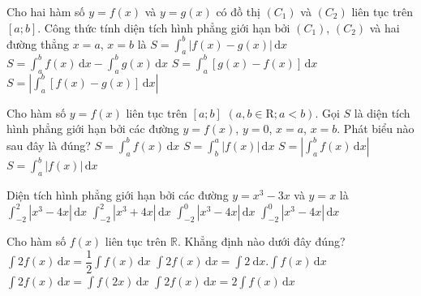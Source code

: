 \begin{ex}%
	Cho hai hàm  số $y = f(x)$ và $y = g(x)$ có đồ thị $(C_1)$ và $(C_2)$ liên tục trên $[a;b]$. Công thức tính diện tích hình phẳng giới hạn bởi $(C_1)$, $(C_2)$ và hai đường thẳng $x=a$, $x=b$ là
	\choice 
		{\True $S =  \displaystyle\int_{a}^{b} |f(x)-g(x)|\mathrm{\,d}x$}
		{$S = \displaystyle\int_{a}^{b} f(x)\mathrm{\,d}x -  \displaystyle\int_{a}^{b} g(x)\mathrm{\,d}x$}
		{$S  = \displaystyle\int_{a}^{b} [g(x)-f(x)]\mathrm{\,d}x$}
		{$S = \left|  \displaystyle\int_{a}^{b} [f(x)-g(x)]\mathrm{\,d}x \right|$}
\end{ex}

\begin{ex}%
	Cho hàm số $y=f(x)$ liên tục trên $\left[a;b \right]$ $(a,b\in \mathrm{R}; a<b)$. Gọi $S$ là diện tích hình phẳng giới hạn bởi các đường $y=f(x)$, $y=0$,  $x=a$, $x=b$. Phát biểu nào sau đây là đúng?
	\choice 
		{$S=\displaystyle\int_a^b  f(x)\mathrm{\,d}x$}
		{$S=\displaystyle\int_b^a  \left| f(x) \right|\mathrm{\,d}x$}
		{$S=\left| \displaystyle\int_a^b  f(x)\mathrm{\,d}x \right|$}
		{\True $S=\displaystyle\int_a^b \left|  f(x) \right|\mathrm{\,d}x$}
\end{ex}

\begin{ex}%
	Diện tích hình phẳng giới hạn  bởi các đường $y = x^3 - 3x$ và $y = x$ là
	 \choice
		{\True $\displaystyle\int_{-2}^{2} |x^3 -  4x| \mathrm{\,d}x$}
		{$\displaystyle\int_{-2}^{2} |x^3 + 4x|  \mathrm{\,d}x$}
		{$\displaystyle\int_{-2}^{0} |x^3 -  4x| \mathrm{\,d}x$}
		{$\displaystyle\int_{-2}^{0} |x^3 - 4x|  \mathrm{\,d}x$}
\end{ex}

\begin{ex}%
	 Cho hàm số $f(x)$ liên tục trên $\mathbb{R}$. Khẳng định nào dưới đây đúng?
	\choice 
		{$\displaystyle\int  2 f(x)\mathrm{\,d}x=\dfrac{1}{2} \displaystyle\int f(x)\mathrm{\,d}x$}
		 {$\displaystyle\int 2 f(x)\mathrm{\,d}x=\displaystyle\int 2 \mathrm{~d} x. \displaystyle\int f(x)\mathrm{\,d}x$}
		{$\displaystyle\int 2 f(x)\mathrm{\,d}x=\displaystyle\int  f(2 x)\mathrm{\,d}x$}
		{\True $\displaystyle\int 2 f(x)\mathrm{\,d}x=2 \displaystyle\int f(x)\mathrm{\,d}x$} 
\end{ex}

